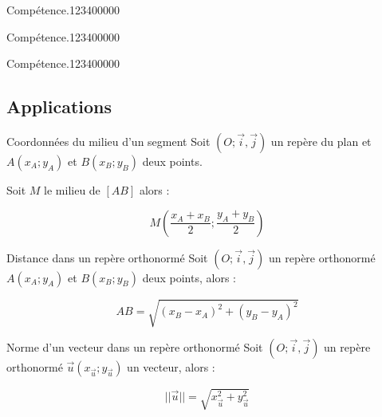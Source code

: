 
\begin{pageAD}  %
\restoregeometry %


\begin{ExoCad}{Compétence.}{1234}{0}{0}{0}{0}{0}

\end{ExoCad}


\begin{ExoCad}{Compétence.}{1234}{0}{0}{0}{0}{0}

\end{ExoCad}


\begin{ExoCad}{Compétence.}{1234}{0}{0}{0}{0}{0}

\end{ExoCad}
 
\end{pageAD} %


\begin{pageCours} %


\section{Applications}

\begin{PpT}{Coordonnées du milieu d'un segment}
Soit $(O;\vec{i},\vec{j})$ un repère du plan et $A(x_A;y_A)$ et $B(x_B;y_B)$ deux points.

Soit $M$ le milieu de $[AB]$ alors :

\[M(\frac{x_A+x_B}{2};\frac{y_A+y_B}{2})\]
\end{PpT}

\begin{PpT}{Distance dans un repère orthonormé}
Soit $(O;\vec{i},\vec{j})$ un repère orthonormé $A(x_A;y_A)$ et $B(x_B;y_B)$ deux points, alors :

\[AB=\sqrt{(x_B-x_A)^2+(y_B-y_A)^2}\]
\end{PpT}

\begin{PpT}{Norme d'un vecteur dans un repère orthonormé}
Soit $(O;\vec{i},\vec{j})$ un repère orthonormé $\vec{u}(x_{\vec{u}};y_{\vec{u}})$ un vecteur, alors :

\[||\vec{u}||=\sqrt{x^2_{\vec{u}}+y^2_{\vec{u}}}\]
\end{PpT}

\end{pageCours} %

